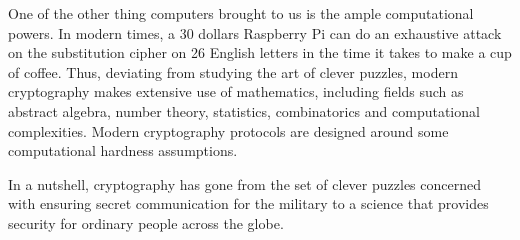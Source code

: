 \par One of the other thing computers brought to us is the ample computational powers. In modern times, a 30 dollars Raspberry Pi can do an exhaustive attack on the substitution cipher on 26 English letters in the time it takes to make a cup of coffee. Thus, deviating from studying the art of clever puzzles, modern cryptography makes extensive use of mathematics, including fields such as abstract algebra, number theory, statistics, combinatorics and computational complexities. Modern cryptography protocols are designed around some computational hardness assumptions.
\par In a nutshell, cryptography has gone from the set of clever puzzles concerned with ensuring secret communication for the military to a science that provides security for ordinary people across the globe.

